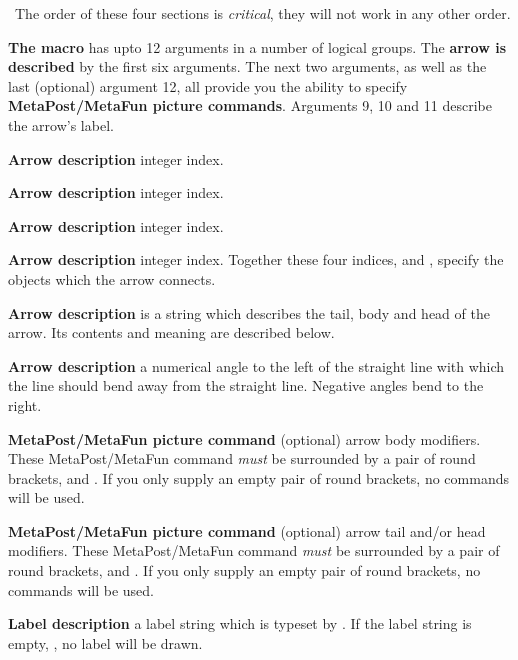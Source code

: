 \stopitemize

\noindent\ The order of these four sections is \emph{critical}, they will 
not work in any other order.

{\bf The  macro} has upto 12 arguments in a number of 
logical groups. The {\bf arrow is described} by the first six arguments. 
The next two arguments, as well as the last (optional) argument 12, all 
provide you the ability to specify {\bf MetaPost/MetaFun picture 
commands}. Arguments 9, 10 and 11 describe the arrow's label. 

\startitemize[n]

\item {\bf Arrow description }  integer index. 

\item {\bf Arrow description }  integer index. 

\item {\bf Arrow description }  integer index. 

\item {\bf Arrow description }  integer index. Together these 
four indices,  and , specify 
the objects which the arrow connects. 

\item {\bf Arrow description }  is a string which 
describes the tail, body and head of the arrow. Its contents and meaning 
are described below. 

\item {\bf Arrow description }  a numerical angle to the left 
of the straight line with which the line should bend away from the 
straight line. Negative angles bend to the right. 

\item {\bf MetaPost/MetaFun picture command} (optional) arrow body 
modifiers. These MetaPost/MetaFun command \emph{must} be surrounded by a 
pair of round brackets,  and . If you only supply an 
empty pair of round brackets, no commands will be used. 

\item {\bf MetaPost/MetaFun picture command} (optional) arrow tail and/or 
head modifiers. These MetaPost/MetaFun command \emph{must} be surrounded 
by a pair of round brackets,  and . If you only supply 
an empty pair of round brackets, no commands will be used. 

\item {\bf Label description} a label string which is typeset by \ConTeXt. 
If the label string is empty, , no label will be drawn.

